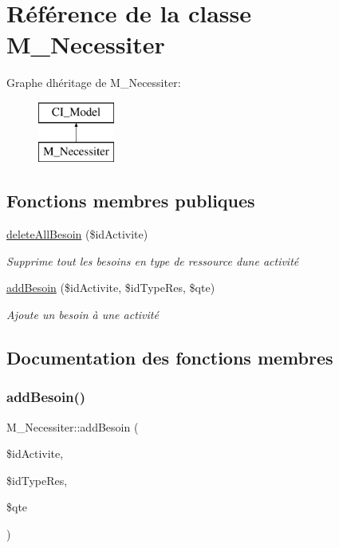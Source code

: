 \hypertarget{class_m___necessiter}{}\section{Référence de la classe M\+\_\+\+Necessiter}
\label{class_m___necessiter}
Graphe d\textquotesingle{}héritage de M\+\_\+\+Necessiter\+:\begin{figure}[H]
\begin{center}
\leavevmode
\includegraphics[height=2.000000cm]{class_m___necessiter}
\end{center}
\end{figure}
\subsection*{Fonctions membres publiques}
\begin{DoxyCompactItemize}
\item 
\hyperlink{class_m___necessiter_a6495c131e77c83063ec7e632e0336d9e}{delete\+All\+Besoin} (\$id\+Activite)
\begin{DoxyCompactList}\small\item\em Supprime tout les besoins en type de ressource d\textquotesingle{}une activité \end{DoxyCompactList}\item 
\hyperlink{class_m___necessiter_a1648d2b93a42da788b351a3e71afe4fc}{add\+Besoin} (\$id\+Activite, \$id\+Type\+Res, \$qte)
\begin{DoxyCompactList}\small\item\em Ajoute un besoin à une activité \end{DoxyCompactList}\end{DoxyCompactItemize}


\subsection{Documentation des fonctions membres}
\mbox{\label{class_m___necessiter_a1648d2b93a42da788b351a3e71afe4fc}} 
\subsubsection{\texorpdfstring{add\+Besoin()}{addBesoin()}}
{\footnotesize\ttfamily M\+\_\+\+Necessiter\+::add\+Besoin (\begin{DoxyParamCaption}\item[{}]{\$id\+Activite,  }\item[{}]{\$id\+Type\+Res,  }\item[{}]{\$qte }\end{DoxyParamCaption})}



